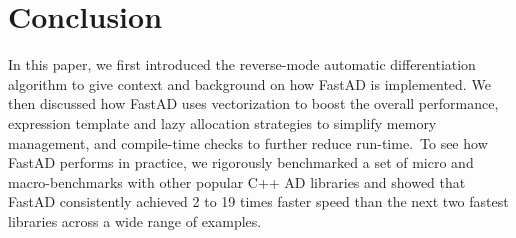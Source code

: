 \section{Conclusion}

In this paper, we first introduced the reverse-mode automatic differentiation algorithm
to give context and background on how FastAD is implemented.
We then discussed how FastAD uses vectorization to boost the overall performance, 
expression template and lazy allocation strategies to simplify memory management,
and compile-time checks to further reduce run-time.\
To see how FastAD performs in practice, we rigorously benchmarked 
a set of micro and macro-benchmarks
with other popular C++ AD libraries and showed that FastAD consistently achieved
2 to 19 times faster speed than the next two fastest libraries across a wide range of examples.
